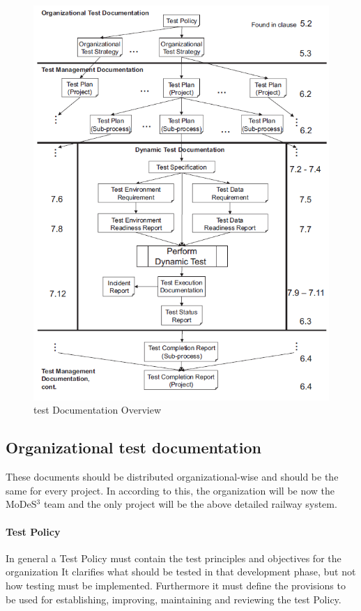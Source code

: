 \begin{figure}[!h]
	\centering
	\includegraphics[width=150mm, keepaspectratio]{figures/testDesign/TestDoc.png}
	\caption{test Documentation Overview}
	\label{fig:TestDocOverview}
\end{figure}

\subsection{Organizational test documentation}
These documents should be distributed organizational-wise and should be the same for every project. In according to this, the organization will be now the MoDeS$^3$ team and the only project will be the above detailed railway system.

\paragraph{Test Policy}
In general a Test Policy must contain the test principles and objectives for the organization It clarifies what should be tested in that development phase, but not how testing must be implemented. Furthermore it must define the provisions to be used for establishing, improving, maintaining and reviewing the test Policy.

